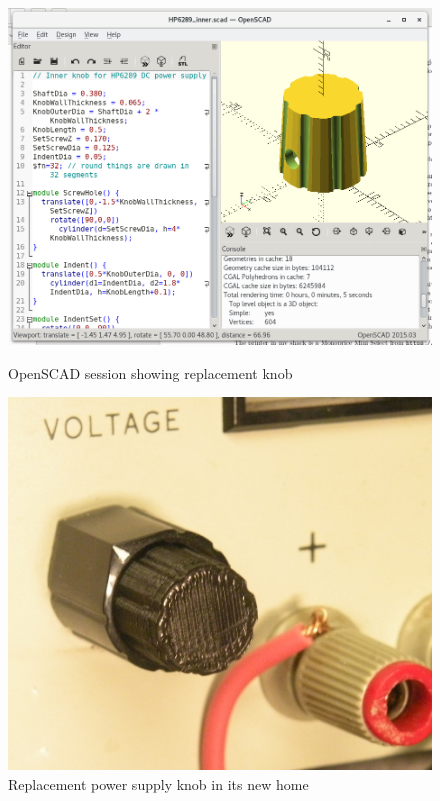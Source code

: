 \documentclass[12pt]{article}
\begin{document}
\begin{figure}[tb]
  \centering
  \begin{minipage}[b]{0.4\textwidth}
    \centering
    \includegraphics[width=\textwidth]{PSKnob_OpenSCAD.png}
    \caption{\label{f_openscad}OpenSCAD session showing replacement knob}
  \end{minipage}\qquad
  \begin{minipage}[b]{0.4\textwidth}
    \centering
    \includegraphics[width=\textwidth]{SmallKnob.jpg}
    \caption{\label{f_knobs_on_box}Replacement power supply knob in its new home}
  \end{minipage}
\end{figure}
\end{document}
